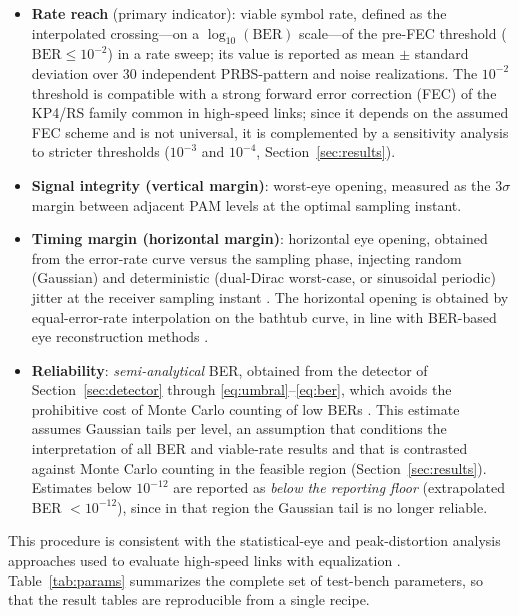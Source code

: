 \documentclass[twocolumn]{USG}
\begin{document}
\begin{itemize}
\item \textbf{Rate reach} (primary indicator): viable symbol rate, defined
as the interpolated crossing---on a $\log_{10}(\mathrm{BER})$ scale---of the
pre-FEC threshold ($\mathrm{BER}\le 10^{-2}$) in a rate sweep; its value is
reported as mean $\pm$ standard deviation over 30 independent PRBS-pattern
and noise realizations. The $10^{-2}$ threshold is compatible with a strong
forward error correction (FEC) of the KP4/RS family common in high-speed
links; since it depends on the assumed FEC scheme and is not universal, it
is complemented by a sensitivity analysis to stricter thresholds ($10^{-3}$
and $10^{-4}$, Section~\ref{sec:results}).
\item \textbf{Signal integrity (vertical margin)}: worst-eye opening,
measured as the $3\sigma$ margin between adjacent PAM levels at the optimal
sampling instant.
\item \textbf{Timing margin (horizontal margin)}: horizontal eye opening,
obtained from the error-rate curve versus the sampling phase, injecting
random (Gaussian) and deterministic (dual-Dirac worst-case, or sinusoidal
periodic) jitter at the receiver sampling instant \cite{805809,9874925}. The
horizontal opening is obtained by equal-error-rate interpolation on the
bathtub curve, in line with BER-based eye reconstruction methods
\cite{Chen2024BER}.
\item \textbf{Reliability}: \emph{semi-analytical} BER, obtained from the
detector of Section~\ref{sec:detector} through
\eqref{eq:umbral}--\eqref{eq:ber}, which avoids the prohibitive cost of Monte
Carlo counting of low BERs \cite{6248821,7202856,10415105}. This estimate assumes Gaussian
tails per level, an assumption that conditions the interpretation of all BER
and viable-rate results and that is contrasted against Monte Carlo counting
in the feasible region (Section~\ref{sec:results}). Estimates below
$10^{-12}$ are reported as \emph{below the reporting floor} (extrapolated
BER $<10^{-12}$), since in that region the Gaussian tail is no longer
reliable.
\end{itemize}

This procedure is consistent with the statistical-eye and peak-distortion
analysis approaches used to evaluate high-speed links with equalization
\cite{10705630}. Table~\ref{tab:params} summarizes the complete set of
test-bench parameters, so that the result tables are reproducible from a
single recipe.


\end{document}
